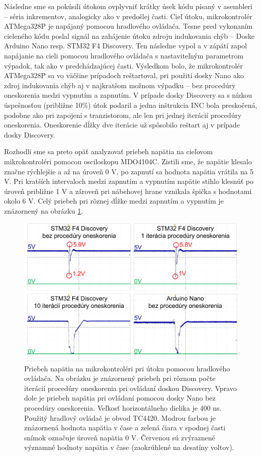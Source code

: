 Následne sme sa pokúsili útokom ovplyvniť krátky úsek kódu písaný v asembleri -- séria inkrementov, analogicky ako v predošlej časti. Cieľ útoku, mikrokontrolér ATMega328P je napájaný pomocou hradlového ovládača. Tesne pred vykonaním cieleného kódu poslal signál na zahájenie útoku zdroju indukovania chýb -- Doske Arduino Nano resp. STM32 F4 Discovery. Ten následne vypol a v zápätí zapol napájanie na cieli pomocou hradlového ovládača s nastaviteľným parametrom výpadok, tak ako v predchádzajúcej časti. Výsledkom bolo, že mikrokontrolér ATMega328P sa vo väčšine prípadoch reštartoval, pri použití dosky Nano ako zdroj indukovania chýb aj v najkratšom možnom výpadku -- bez procedúry oneskorenia medzi vypnutím a zapnutím. V prípade dosky Discovery sa s nízkou úspešnosťou (približne 10\%) útok podaril a jedna inštrukcia INC bola preskočená, podobne ako pri zapojení s tranzistorom, ale len pri jednej iterácií procedúry oneskorenia. Oneskorenie dĺžky dve iterácie už spôsobilo reštart aj v prípade dosky Discovery.

Rozhodli sme sa preto opäť analyzovať priebeh napätia na cieľovom mikrokontroléri pomocou osciloskopu MDO4104C. Zistili sme, že napätie klesalo značne rýchlejšie a až na úroveň 0 V, po zapnutí sa hodnota napätia vrátila na 5 V. Pri kratších intervaloch medzi zapnutím a vypnutím napätie stihlo klesnúť po úroveň približne 1 V a zároveň pri nábehovej hrane vznikala špička s hodnotami okolo 6 V. Celý priebeh pri rôznej dĺžke medzi zapnutím a vypnutím je znázornený na obrázku \ref{obr:gateDriverAnalysis}.

\begin{figure}
    \centerline{\includegraphics[width=1\textwidth]{images/gateDriverAnalysis.png}}
    \caption[Priebeh napätia na mikrokontroléri pri útoku hradlovým ovládačom]{Priebeh napätia na mikrokontroléri pri útoku pomocou hradlového ovládača. Na obrázku je znázornený priebeh pri rôznom počte iterácií procedúry oneskorenia pri ovládaní doskou Discovery. Vpravo dole je priebeh napätia pri ovládaní pomocou dosky Nano bez procedúry oneskorenia. Veľkosť horizontálneho dielika je 400 ns. Použitý hradlový ovládač je obvod TC4420. Modrou farbou je znázornená hodnota napätia v čase a zelená čiara v spodnej časti snímok označuje úroveň napätia 0 V. Červenou sú zvýraznené významné hodnoty napätia v čase (zaokrúhlené na desatiny voltov).}
    \label{obr:gateDriverAnalysis}
\end{figure}

